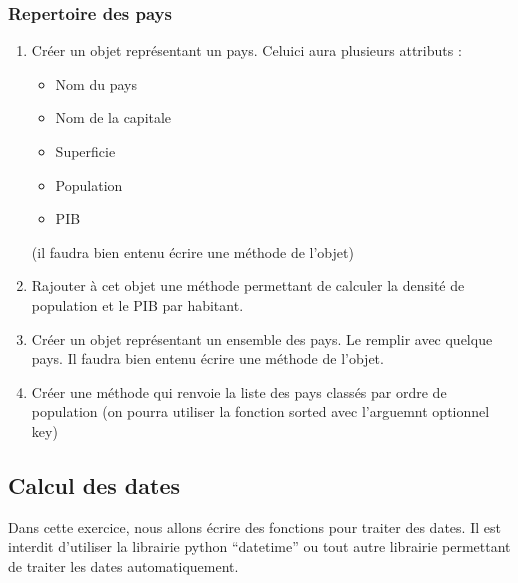 \documentclass[letterpaper,10pt,english]{sphinxhowto}
\begin{document}
\subsubsection{Repertoire des pays}
\label{\detokenize{exercices_objets:repertoire-des-pays}}\begin{enumerate}
%
\item {} 
\sphinxAtStartPar
Créer un objet représentant un pays. Celui\sphinxhyphen{}ci aura plusieurs attributs :
\begin{itemize}
\item {} 
\sphinxAtStartPar
Nom du pays

\item {} 
\sphinxAtStartPar
Nom de la capitale

\item {} 
\sphinxAtStartPar
Superficie

\item {} 
\sphinxAtStartPar
Population

\item {} 
\sphinxAtStartPar
PIB

\end{itemize}

\sphinxAtStartPar
(il faudra bien entenu écrire une méthode  de l’objet)

\item {} 
\sphinxAtStartPar
Rajouter à cet objet une méthode permettant de calculer la densité de population et le PIB par habitant.

\item {} 
\sphinxAtStartPar
Créer un objet représentant un ensemble des pays. Le remplir avec quelque pays. Il faudra bien entenu écrire une méthode  de l’objet.

\item {} 
\sphinxAtStartPar
Créer une méthode qui renvoie la liste des pays classés par ordre de population (on pourra utiliser la fonction sorted avec l’arguemnt optionnel key)

\end{enumerate}


\subsection{Calcul des dates}
\label{\detokenize{devoir_maison_Devoir Maison:calcul-des-dates}}\label{\detokenize{devoir_maison_Devoir Maison::doc}}
\sphinxAtStartPar
Dans cette exercice, nous allons écrire des fonctions pour traiter des dates. Il est interdit d’utiliser la librairie python “datetime” ou tout autre librairie permettant de traiter les dates automatiquement.
\end{document}
